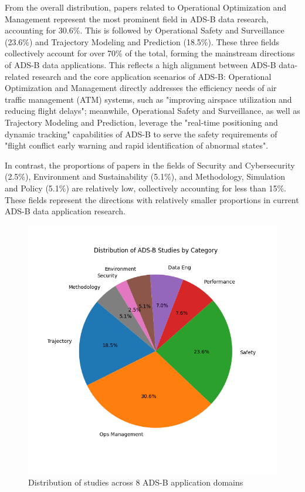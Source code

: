 From the overall distribution, papers related to Operational Optimization and Management represent the most prominent field in ADS-B data research, accounting for 30.6\%. This is followed by Operational Safety and Surveillance (23.6\%) and Trajectory Modeling and Prediction (18.5\%). These three fields collectively account for over 70\% of the total, forming the mainstream directions of ADS-B data applications. This reflects a high alignment between ADS-B data-related research and the core application scenarios of ADS-B: Operational Optimization and Management directly addresses the efficiency needs of air traffic management (ATM) systems, such as "improving airspace utilization and reducing flight delays"; meanwhile, Operational Safety and Surveillance, as well as Trajectory Modeling and Prediction, leverage the "real-time positioning and dynamic tracking" capabilities of ADS-B to serve the safety requirements of "flight conflict early warning and rapid identification of abnormal states".

In contrast, the proportions of papers in the fields of Security and Cybersecurity (2.5\%), Environment and Sustainability (5.1\%), and Methodology, Simulation and Policy (5.1\%) are relatively low, collectively accounting for less than 15\%. These fields represent the directions with relatively smaller proportions in current ADS-B data application research.

\begin{figure}
	\centering
	\includegraphics[width=0.5\linewidth]{paper_piechart}
	\caption[Figure 2]{Distribution of studies across 8 ADS-B application domains}
	\label{fig:paperpiechart2}
\end{figure}


